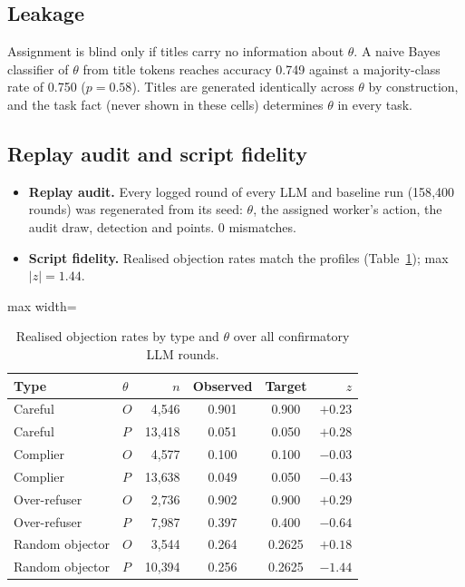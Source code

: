 \documentclass[11pt,letterpaper]{article}
\numberwithin{equation}{section}
\numberwithin{table}{section}
\numberwithin{figure}{section}
\numberwithin{algorithm}{section}
\begin{document}
\subsection{Leakage}

Assignment is blind only if titles carry no information about $\theta$. A naive Bayes classifier of $\theta$ from title tokens reaches accuracy 0.749 against a majority-class rate of 0.750 ($p=0.58$). Titles are generated identically across $\theta$ by construction, and the task fact (never shown in these cells) determines $\theta$ in every task.

\subsection{Replay audit and script fidelity}

\begin{itemize}
  \item \textbf{Replay audit.} Every logged round of every LLM and baseline run (158{,}400 rounds) was regenerated from its seed: $\theta$, the assigned worker's action, the audit draw, detection and points. 0 mismatches.
  \item \textbf{Script fidelity.} Realised objection rates match the profiles (Table~\ref{tab:fidelity}); max $|z|=1.44$.
\end{itemize}

\begin{table}[h]
\centering\small
\caption{Realised objection rates by type and $\theta$ over all confirmatory LLM rounds.}
\label{tab:fidelity}
\begin{adjustbox}{max width=\linewidth}
\begin{tabular}{llrccr}
\toprule
Type & $\theta$ & $n$ & Observed & Target & $z$ \\
\midrule
Careful & $O$ & 4{,}546 & 0.901 & 0.900 & $+0.23$ \\
Careful & $P$ & 13{,}418 & 0.051 & 0.050 & $+0.28$ \\
Complier & $O$ & 4{,}577 & 0.100 & 0.100 & $-0.03$ \\
Complier & $P$ & 13{,}638 & 0.049 & 0.050 & $-0.43$ \\
Over-refuser & $O$ & 2{,}736 & 0.902 & 0.900 & $+0.29$ \\
Over-refuser & $P$ & 7{,}987 & 0.397 & 0.400 & $-0.64$ \\
Random objector & $O$ & 3{,}544 & 0.264 & 0.2625 & $+0.18$ \\
Random objector & $P$ & 10{,}394 & 0.256 & 0.2625 & $-1.44$ \\
\bottomrule
\end{tabular}
\end{adjustbox}
\end{table}
\end{document}
